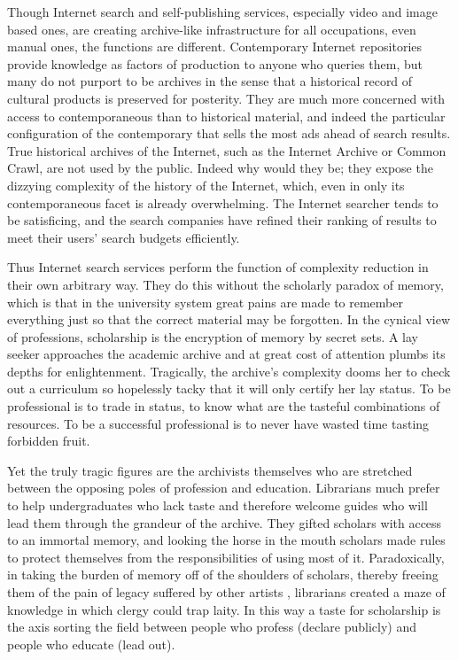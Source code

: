 \documentclass[]{book}
\theoremstyle{definition}
\theoremstyle{definition}
\theoremstyle{definition}
\theoremstyle{remark}
\begin{document}
Though Internet search and self-publishing services, especially video
and image based ones, are creating archive-like infrastructure for all
occupations, even manual ones, the functions are different. Contemporary
Internet repositories provide knowledge as factors of production to
anyone who queries them, but many do not purport to be archives in the
sense that a historical record of cultural products is preserved for
posterity. They are much more concerned with access to contemporaneous
than to historical material, and indeed the particular configuration of
the contemporary that sells the most ads ahead of search results. True
historical archives of the Internet, such as the Internet Archive or
Common Crawl, are not used by the public. Indeed why would they be; they
expose the dizzying complexity of the history of the Internet, which,
even in only its contemporaneous facet is already overwhelming. The
Internet searcher tends to be satisficing, and the search companies have
refined their ranking of results to meet their users' search budgets
efficiently.

Thus Internet search services perform the function of complexity
reduction in their own arbitrary way. They do this without the scholarly
paradox of memory, which is that in the university system great pains
are made to remember everything just so that the correct material may be
forgotten. In the cynical view of professions, scholarship is the
encryption of memory by secret sets. A lay seeker approaches the
academic archive and at great cost of attention plumbs its depths for
enlightenment. Tragically, the archive's complexity dooms her to check
out a curriculum so hopelessly tacky that it will only certify her lay
status. To be professional is to trade in status, to know what are the
tasteful combinations of resources. To be a successful professional is
to never have wasted time tasting forbidden fruit.

Yet the truly tragic figures are the archivists themselves who are
stretched between the opposing poles of profession and education.
Librarians much prefer to help undergraduates who lack taste and
therefore welcome guides who will lead them through the grandeur of the
archive. They gifted scholars with access to an immortal memory, and
looking the horse in the mouth scholars made rules to protect themselves
from the responsibilities of using most of it. Paradoxically, in taking
the burden of memory off of the shoulders of scholars, thereby freeing
them of the pain of legacy suffered by other artists
\citep{Lang1988Recognition}, librarians created a maze of knowledge in
which clergy could trap laity. In this way a taste for scholarship is
the axis sorting the field between people who profess (declare publicly)
and people who educate (lead out).
\end{document}
